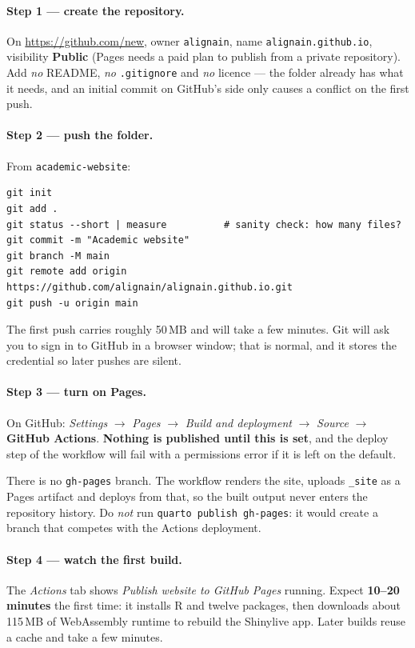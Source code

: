 \documentclass[11pt,a4paper]{article}
\newcommand{\file}[1]{\texttt{#1}}
\begin{document}
\paragraph{Step 1 --- create the repository.} On
\url{https://github.com/new}, owner \texttt{alignain}, name
\texttt{alignain.github.io}, visibility \textbf{Public} (Pages needs a paid
plan to publish from a private repository). Add \emph{no} README,
\emph{no} \file{.gitignore} and \emph{no} licence --- the folder already has
what it needs, and an initial commit on GitHub's side only causes a
conflict on the first push.

\paragraph{Step 2 --- push the folder.} From \file{academic-website}:
\begin{lstlisting}
git init
git add .
git status --short | measure          # sanity check: how many files?
git commit -m "Academic website"
git branch -M main
git remote add origin https://github.com/alignain/alignain.github.io.git
git push -u origin main
\end{lstlisting}
The first push carries roughly 50\,MB and will take a few minutes. Git will
ask you to sign in to GitHub in a browser window; that is normal, and it
stores the credential so later pushes are silent.

\paragraph{Step 3 --- turn on Pages.} On GitHub:
\emph{Settings} $\to$ \emph{Pages} $\to$ \emph{Build and deployment} $\to$
\emph{Source} $\to$ \textbf{GitHub Actions}. \textbf{Nothing is published
until this is set}, and the deploy step of the workflow will fail with a
permissions error if it is left on the default.

There is no \texttt{gh-pages} branch. The workflow renders the site, uploads
\file{\_site} as a Pages artifact and deploys from that, so the built output
never enters the repository history. Do \emph{not} run
\texttt{quarto publish gh-pages}: it would create a branch that competes
with the Actions deployment.

\paragraph{Step 4 --- watch the first build.} The \emph{Actions} tab shows
\emph{Publish website to GitHub Pages} running. Expect \textbf{10--20
minutes} the first time: it installs R and twelve packages, then downloads
about 115\,MB of WebAssembly runtime to rebuild the Shinylive app. Later
builds reuse a cache and take a few minutes.
\end{document}

